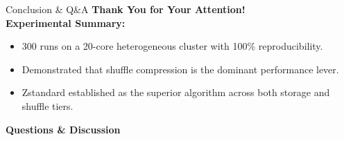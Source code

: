 \documentclass[aspectratio=169, 10pt]{beamer}
\begin{document}
\begin{frame}[c]{Conclusion \& Q\&A}
  \centering
  \Large
  \textbf{Thank You for Your Attention!}\\[0.4cm]

  \normalsize
  \textbf{Experimental Summary:}
  \begin{itemize}
    \centering
    \small
    \item 300 runs on a 20-core heterogeneous cluster with 100\% reproducibility.
    \item Demonstrated that shuffle compression is the dominant performance lever.
    \item Zstandard established as the superior algorithm across both storage and shuffle tiers.
  \end{itemize}

  \vspace{0.4cm}
  \large
  \textbf{Questions \& Discussion}
\end{frame}
\end{document}
